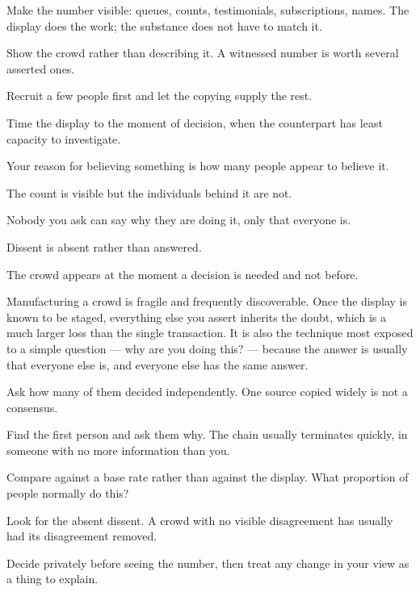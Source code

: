 \begin{application}
  \item Make the number visible: queues, counts, testimonials, subscriptions, names. The display does the work; the substance does not have to match it.
  \item Show the crowd rather than describing it. A witnessed number is worth several asserted ones.
  \item Recruit a few people first and let the copying supply the rest.
  \item Time the display to the moment of decision, when the counterpart has least capacity to investigate.
\end{application}

\begin{feedback}
  \item Your reason for believing something is how many people appear to believe it.
  \item The count is visible but the individuals behind it are not.
  \item Nobody you ask can say why they are doing it, only that everyone is.
  \item Dissent is absent rather than answered.
  \item The crowd appears at the moment a decision is needed and not before.
\end{feedback}

\begin{failure}
Manufacturing a crowd is fragile and frequently discoverable. Once the display is known to be staged, everything else you assert inherits the doubt, which is a much larger loss than the single transaction. It is also the technique most exposed to a simple question --- why are you doing this? --- because the answer is usually that everyone else is, and everyone else has the same answer.
\end{failure}

\begin{countermeasures}
  \item Ask how many of them decided independently. One source copied widely is not a consensus.
  \item Find the first person and ask them why. The chain usually terminates quickly, in someone with no more information than you.
  \item Compare against a base rate rather than against the display. What proportion of people normally do this?
  \item Look for the absent dissent. A crowd with no visible disagreement has usually had its disagreement removed.
  \item Decide privately before seeing the number, then treat any change in your view as a thing to explain.
\end{countermeasures}

\seesources
{}
